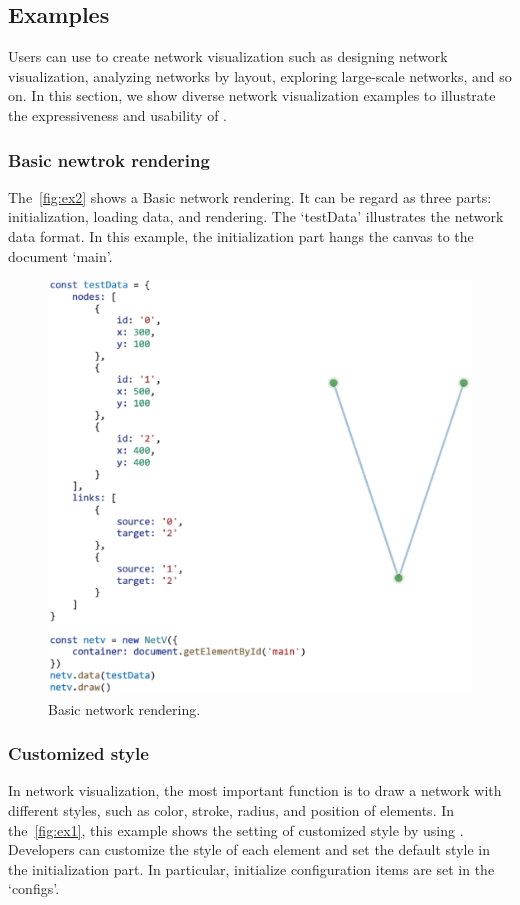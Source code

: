 \subsection{Examples}
Users can use \name to create network visualization such as designing network visualization, analyzing networks by layout, exploring large-scale networks, and so on. In this section, we show diverse network visualization examples to illustrate the expressiveness and usability of \name.

\subsubsection{Basic newtrok rendering}
The~\autoref{fig:ex2} shows a Basic network rendering. It can be regard as three parts: initialization, loading data, and rendering. The `testData' illustrates the network data format. In this example, the initialization part hangs the canvas to the document `main'.
\begin{figure}[htbp]
    \includegraphics[width=\linewidth]{fig/ex2.eps}
    \caption{
        Basic network rendering.
    }
    \label{fig:ex2}
\end{figure}

\subsubsection{Customized style}
In network visualization, the most important function is to draw a network with different styles, such as color, stroke, radius, and position of elements.
In the~\autoref{fig:ex1}, this example shows the setting of customized style by using \name. Developers can customize the style of each element and set the default style in the initialization part. In particular, initialize configuration items are set in the `configs'.


